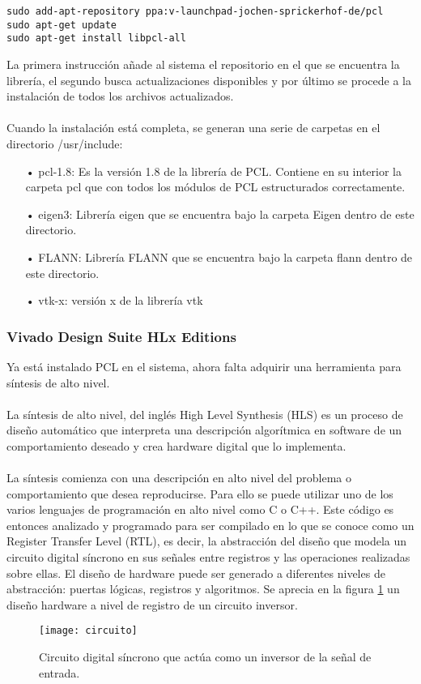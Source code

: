 
\begin{verbatim}
sudo add-apt-repository ppa:v-launchpad-jochen-sprickerhof-de/pcl
sudo apt-get update
sudo apt-get install libpcl-all
\end{verbatim}

La primera instrucción añade al sistema el repositorio en el que se encuentra la librería, el segundo busca actualizaciones disponibles y por último se procede a la instalación de todos los archivos actualizados.
\\
\\
Cuando la instalación está completa, se generan una serie de carpetas en el directorio /usr/include:

\begin{itemize}
\item[•]pcl-1.8: Es la versión 1.8 de la librería de PCL. Contiene en su interior la carpeta pcl que con todos los módulos de PCL estructurados correctamente.
\item[•]eigen3: Librería eigen que se encuentra bajo la carpeta Eigen dentro de este directorio.
\item[•]FLANN: Librería FLANN que se encuentra bajo la carpeta flann dentro de este directorio.
\item[•]vtk-x: versión x de la librería vtk 
\end{itemize}

\subsubsection{Vivado Design Suite HLx Editions}
Ya está instalado PCL en el sistema, ahora falta adquirir una herramienta para síntesis de alto nivel.
\\
\\
La síntesis de alto nivel, del inglés High Level Synthesis (HLS) es un proceso de diseño automático que interpreta una descripción algorítmica en software de un comportamiento deseado y crea hardware digital que lo implementa.
\\
\\
La síntesis comienza con una descripción en alto nivel del problema o comportamiento que desea reproducirse. Para ello se puede utilizar uno de los varios lenguajes de programación en alto nivel como C o C++. Este código es entonces analizado y programado para ser compilado en lo que se conoce como un Register Transfer Level (RTL), es decir, la abstracción del diseño que modela un circuito digital síncrono en sus señales entre registros y las operaciones realizadas sobre ellas.  El diseño de hardware puede ser generado a diferentes niveles de abstracción: puertas lógicas, registros y algoritmos. Se aprecia en la figura \ref{fig:circuito} un diseño hardware a nivel de registro de un circuito inversor.
\begin{figure}[!htb]
\centering
\texttt{[image: circuito]}
  \caption{Circuito digital síncrono que actúa como un inversor de la señal de entrada.}\label{fig:circuito}
\end{figure}


